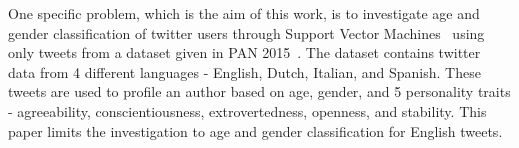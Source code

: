\documentclass[a4paper]{llncs}
\begin{document}
One specific problem, which is the aim of this work, is to investigate age and gender classification of twitter users through Support Vector Machines~\cite{cortes1995support} using only tweets from a dataset given in PAN 2015~\cite{rangel:2015}. The dataset contains twitter data from 4 different languages - English, Dutch, Italian, and Spanish. These tweets are used to profile an author based on age, gender, and 5 personality traits - agreeability, conscientiousness, extrovertedness, openness, and stability. This paper limits the investigation to age and gender classification for English tweets.   



 

\end{document}
